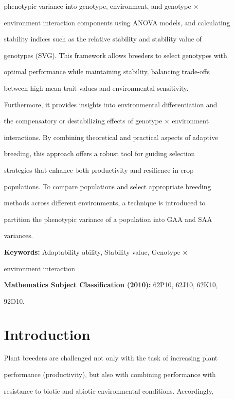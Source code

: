 \documentclass[10pt,twoside]{article}
\numberwithin{equation}{section}
\begin{document}
phenotypic variance into genotype, environment, and genotype ×

environment interaction components using ANOVA models, and calculating

stability indices such as the relative stability and stability value of

genotypes (SVG). This framework allows breeders to select genotypes with

optimal performance while maintaining stability, balancing trade-offs

between high mean trait values and environmental sensitivity.

Furthermore, it provides insights into environmental differentiation and

the compensatory or destabilizing effects of genotype × environment

interactions. By combining theoretical and practical aspects of adaptive

breeding, this approach offers a robust tool for guiding selection

strategies that enhance both productivity and resilience in crop

populations. To compare populations and select appropriate breeding

methods across different environments, a technique is introduced to

partition the phenotypic variance of a population into GAA and SAA

variances.



\textbf{Keywords:} Adaptability ability, Stability value, Genotype ×

environment interaction



\textbf{Mathematics Subject Classification (2010):} 62P10, 62J10, 62K10,

92D10.



\section{Introduction}



Plant breeders are challenged not only with the task of increasing plant

performance (productivity), but also with combining performance with

resistance to biotic and abiotic environmental conditions. Accordingly,
\end{document}
